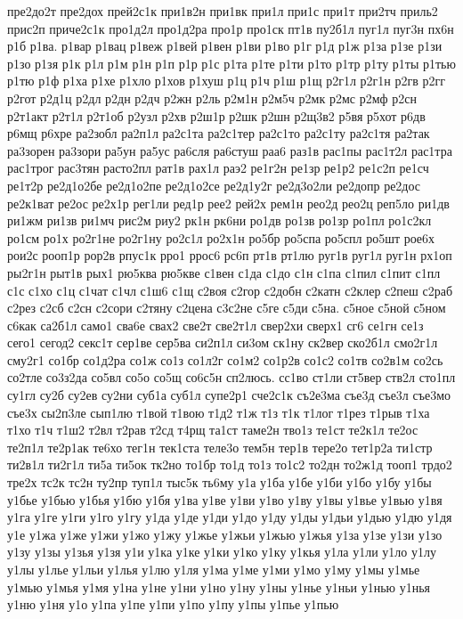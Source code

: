 {пре2до2т
пре2дох
прей2с1к
при1в2н
при1вк
при1л
при1с
при1т
при2тч
приль2
прис2п
приче2с1к
про1д2л
про1д2ра
про1р
про1ск
пт1в
пу2б1л
пуг1л
пуг3н
пх6н
р1б
р1ва.
р1вар
р1вац
р1веж
р1вей
р1вен
р1ви
р1во
р1г
р1д
р1ж
р1за
р1зе
р1зи
р1зо
р1зя
р1к
р1л
р1м
р1н
р1п
р1р
р1с
р1та
р1те
р1ти
р1то
р1тр
р1ту
р1ты
р1тью
р1тю
р1ф
р1ха
р1хе
р1хло
р1хов
р1хуш
р1ц
р1ч
р1ш
р1щ
р2г1л
р2г1н
р2гв
р2гг
р2гот
р2д1ц
р2дл
р2дн
р2дч
р2жн
р2ль
р2м1н
р2м5ч
р2мк
р2мс
р2мф
р2сн
р2т1акт
р2т1л
р2т1об
р2узл
р2хв
р2ш1р
р2шк
р2шн
р2щ3в2
р5вя
р5хот
р6дв
р6мщ
р6хре
ра2зобл
ра2п1л
ра2с1та
ра2с1тер
ра2с1то
ра2с1ту
ра2с1тя
ра2так
ра3зорен
ра3зори
ра5ун
ра5ус
ра6сля
ра6стуш
раа6
раз1в
рас1пы
рас1т2л
рас1тра
рас1трог
рас3тян
расто2пл
рат1в
рах1л
раэ2
ре1г2н
ре1зр
ре1р2
ре1с2п
ре1сч
ре1т2р
ре2д1о2бе
ре2д1о2пе
ре2д1о2се
ре2д1у2г
ре2д3о2ли
ре2допр
ре2дос
ре2к1ват
ре2ос
ре2х1р
рег1ли
ред1р
рее2
рей2х
рем1н
рео2д
рео2ц
реп5ло
ри1дв
ри1жм
ри1зв
ри1мч
рис2м
риу2
рк1н
рк6ни
ро1дв
ро1зв
ро1зр
ро1пл
ро1с2кл
ро1см
ро1х
ро2г1не
ро2г1ну
ро2с1л
ро2х1н
ро5бр
ро5спа
ро5спл
ро5шт
рое6х
рои2с
рооп1р
рор2в
рпус1к
рро1
ррос6
рс6п
рт1в
рт1лю
руг1в
руг1л
руг1н
рх1оп
ры2г1н
рыт1в
рых1
рю5ква
рю5кве
с1вен
с1да
с1до
с1н
с1па
с1пил
с1пит
с1пл
с1с
с1хо
с1ц
с1чат
с1чл
с1ш6
с1щ
с2воя
с2гор
с2добн
с2катн
с2клер
с2пеш
с2раб
с2рез
с2сб
с2сн
с2сори
с2тяну
с2цена
с3с2не
с5ге
с5ди
с5на.
с5ное
с5ной
с5ном
с6как
са2б1л
само1
сва6е
свах2
све2т
све2т1л
свер2хи
сверх1
сг6
се1гн
се1з
сего1
сегод2
секс1т
сер1ве
сер5ва
си2п1л
си3ом
ск1ну
ск2вер
ско2б1л
смо2г1л
сму2г1
со1бр
со1д2ра
со1ж
со1з
со1л2г
со1м2
со1р2в
со1с2
со1тв
со2в1м
со2сь
со2тле
со3з2да
со5вл
со5о
со5щ
со6с5н
сп2люсь.
сс1во
ст1ли
ст5вер
ств2л
сто1пл
су1гл
су2б
су2ев
су2ни
суб1а
суб1л
супе2р1
сче2с1к
съ2е3ма
съе3д
съе3л
съе3мо
съе3х
сы2п3ле
сып1лю
т1вой
т1вою
т1д2
т1ж
т1з
т1к
т1лог
т1рез
т1рыв
т1ха
т1хо
т1ч
т1ш2
т2вл
т2рав
т2сд
т4рщ
та1ст
таме2н
тво1з
те1ст
те2к1л
те2ос
те2п1л
те2р1ак
те6хо
тег1н
тек1ста
теле3о
тем5н
тер1в
тере2о
тет1р2а
ти1стр
ти2в1л
ти2г1л
ти5а
ти5ок
тк2но
то1бр
то1д
то1з
то1с2
то2дн
то2ж1д
тооп1
трдо2
тре2х
тс2к
тс2н
ту2пр
туп1л
тыс5к
ть6му
у1а
у1ба
у1бе
у1би
у1бо
у1бу
у1бы
у1бье
у1бью
у1бья
у1бю
у1бя
у1ва
у1ве
у1ви
у1во
у1ву
у1вы
у1вье
у1вью
у1вя
у1га
у1ге
у1ги
у1го
у1гу
у1да
у1де
у1ди
у1до
у1ду
у1ды
у1дьи
у1дью
у1дю
у1дя
у1е
у1жа
у1же
у1жи
у1жо
у1жу
у1жье
у1жьи
у1жью
у1жья
у1за
у1зе
у1зи
у1зо
у1зу
у1зы
у1зья
у1зя
у1и
у1ка
у1ке
у1ки
у1ко
у1ку
у1кья
у1ла
у1ли
у1ло
у1лу
у1лы
у1лье
у1льи
у1лья
у1лю
у1ля
у1ма
у1ме
у1ми
у1мо
у1му
у1мы
у1мье
у1мью
у1мья
у1мя
у1на
у1не
у1ни
у1но
у1ну
у1ны
у1нье
у1ньи
у1нью
у1нья
у1ню
у1ня
у1о
у1па
у1пе
у1пи
у1по
у1пу
у1пы
у1пье
у1пью
}
